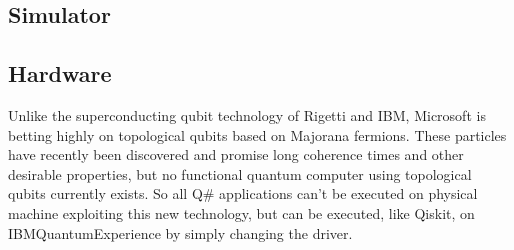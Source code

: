 \documentclass[main.tex]{subfiles}
\begin{document}
	\subsection{Simulator}
	
	
	\subsection{Hardware}
	Unlike the superconducting qubit technology of Rigetti
and IBM, Microsoft is betting highly on topological
qubits based on Majorana fermions. These particles
have recently been discovered and promise long coherence times and other desirable properties, but no functional quantum computer using topological qubits currently exists. So all Q\# applications can't be executed on physical machine exploiting this new technology, but can be executed, like Qiskit, on IBMQuantumExperience by simply changing the driver.
\end{document}
